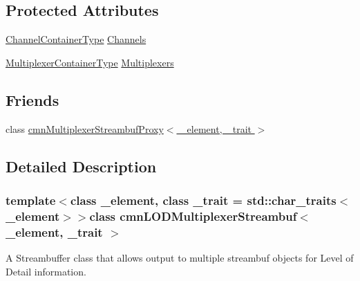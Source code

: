 \subsection*{Protected Attributes}
\begin{DoxyCompactItemize}
\item 
\hyperlink{classcmn_l_o_d_multiplexer_streambuf_a2fd9fe59de3be9b8cf5546ac2b0e41bb}{Channel\+Container\+Type} \hyperlink{classcmn_l_o_d_multiplexer_streambuf_a1a7cbbb28f587e83e402b6ea663bd387}{Channels}
\item 
\hyperlink{classcmn_l_o_d_multiplexer_streambuf_abddd0ebc7e720ea977f857c6350dd5a0}{Multiplexer\+Container\+Type} \hyperlink{classcmn_l_o_d_multiplexer_streambuf_a775d4551d9e37fcca0c27f699a98b838}{Multiplexers}
\end{DoxyCompactItemize}
\subsection*{Friends}
\begin{DoxyCompactItemize}
\item 
class \hyperlink{classcmn_l_o_d_multiplexer_streambuf_a05956cbff9ce3ca1513e6c4e8fd7acd8}{cmn\+Multiplexer\+Streambuf\+Proxy$<$ \+\_\+element, \+\_\+trait $>$}
\end{DoxyCompactItemize}


\subsection{Detailed Description}
\subsubsection*{template$<$class \+\_\+element, class \+\_\+trait = std\+::char\+\_\+traits$<$\+\_\+element$>$$>$class cmn\+L\+O\+D\+Multiplexer\+Streambuf$<$ \+\_\+element, \+\_\+trait $>$}

A Streambuffer class that allows output to multiple streambuf objects for Level of Detail information. 

